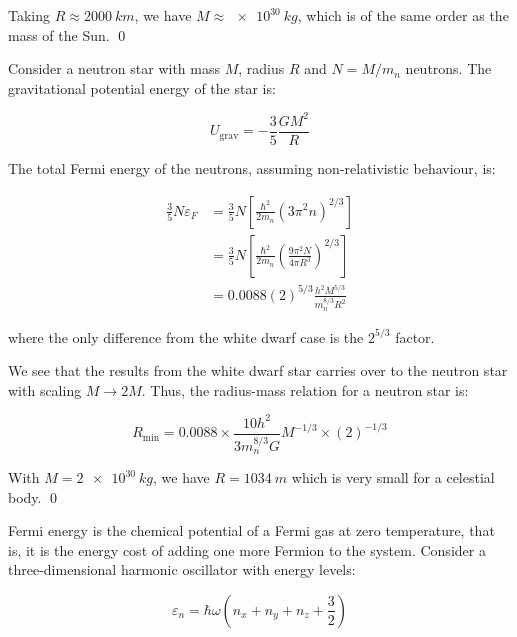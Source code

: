 \documentclass[12pt]{article}
\begin{document}
Taking $R \approx \qty{2000}{km}$, we have $M \approx \qty{e30}{kg}$, which is of the same order as the mass of the Sun.
\qed



Consider a neutron star with mass $M$, radius $R$ and $N = M/m_{n}$ neutrons. The gravitational potential energy of the star is:

\begin{equation}
    U_{\text{grav}} = -\frac{3}{5} \frac{GM^{2}}{R}
\end{equation}

The total Fermi energy of the neutrons, assuming non-relativistic behaviour, is:

\begin{equation}
    \begin{split}
        \frac{3}{5} N \varepsilon_{F} &= \frac{3}{5} N \left[ \frac{\hbar^{2}}{2m_{n}} \left( 3\pi^{2} n \right)^{2/3} \right] \\
        &= \frac{3}{5} N \left[ \frac{\hbar^{2}}{2m_{n}} \left( \frac{9\pi^{2} N}{4\pi R^{3}} \right)^{2/3} \right] \\
        &= 0.0088 (2)^{5/3} \frac{h^{2}M^{5/3}}{m_{n}^{8/3}R^{2}}
    \end{split}
\end{equation}

where the only difference from the white dwarf case is the $2^{5/3}$ factor.

We see that the results from the white dwarf star carries over to the neutron star with scaling $M \to 2M$. Thus, the radius-mass relation for a neutron star is:

\begin{equation}
    R_{\text{min}} = 0.0088 \times \frac{10h^{2}}{3m_{n}^{8/3}G} M^{-1/3} \times (2)^{-1/3}
\end{equation}

With $M = \qty{2e30}{kg}$, we have $R = \qty{1034}{m}$ which is very small for a celestial body.
\qed


Fermi energy is the chemical potential of a Fermi gas at zero temperature, that is, it is the energy cost of adding one more Fermion to the system. Consider a three-dimensional harmonic oscillator with energy levels:

\begin{equation}
    \varepsilon_{n} = \hbar \omega \left( n_{x} + n_{y} + n_{z} + \frac{3}{2} \right)
\end{equation}
\end{document}
